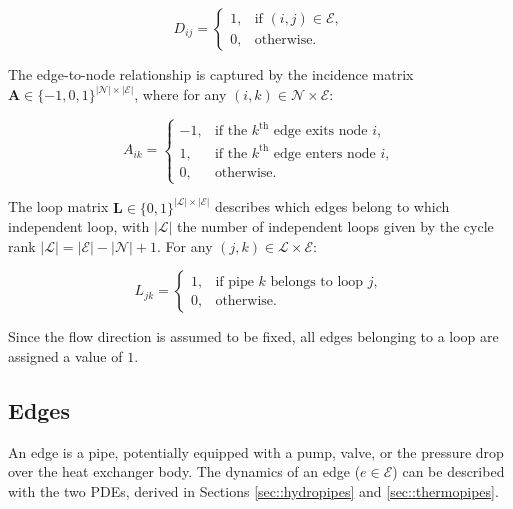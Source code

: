 \begin{equation}\label{eq::adjacencymatrix}
D_{ij}= \begin{cases}
1, & \text{if } (i,j) \in \mathcal{E}, \\
0, & \text{otherwise.}
\end{cases}
\end{equation}

The edge-to-node relationship is captured by the incidence matrix 
$\mathbf{A} \in \{-1,0,1\}^{|\mathcal{N}| \times |\mathcal{E}|}$, where for 
any $(i,k) \in \mathcal{N} \times \mathcal{E}$:

\begin{equation}\label{eq::incidencematrix}
A_{ik}= \begin{cases}
-1, & \text{if the } k^{\text{th}} \text{ edge exits node } i, \\
 1, & \text{if the } k^{\text{th}} \text{ edge enters node } i, \\
 0, & \text{otherwise.}
\end{cases}
\end{equation}

The loop matrix $\mathbf{L} \in \{0,1\}^{|\mathcal{L}| \times |\mathcal{E}|}$ 
describes which edges belong to which independent loop, with $|\mathcal{L}|$ 
the number of independent loops given by the cycle rank $|\mathcal{L}| = |\mathcal{E}| - |\mathcal{N}| + 1$. For any 
$(j,k) \in \mathcal{L} \times \mathcal{E}$:

\begin{equation}\label{eq::loopmatrix}
L_{jk}=\begin{cases}
1, & \text{if pipe } k \text{ belongs to loop } j, \\
0, & \text{otherwise.}
\end{cases}
\end{equation}

\noindent Since the flow direction is assumed to be fixed, all edges belonging 
to a loop are assigned a value of $1$.

\subsection{Edges}
An edge is a pipe, potentially equipped with a pump, valve, or the pressure drop over the heat exchanger body. The dynamics of an edge ($e \in \mathcal{E}$) can be described with the two PDEs, derived in Sections \ref{sec::hydropipes} and \ref{sec::thermopipes}.

